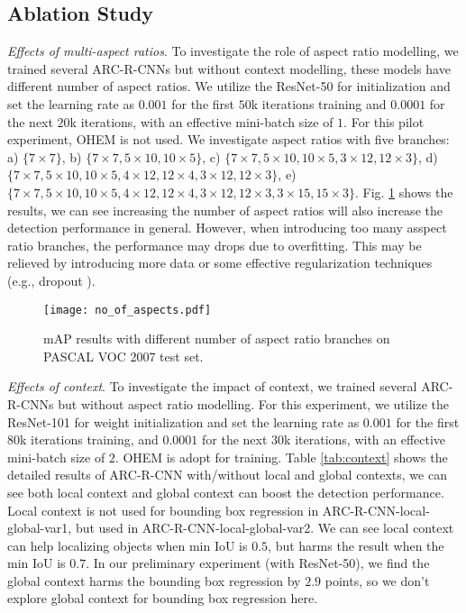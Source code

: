 \documentclass[10pt,twocolumn,letterpaper]{article}
\begin{document}
\subsection{Ablation Study}
\vspace{-1mm}
\textit{Effects of multi-aspect ratios}.
To investigate the role of aspect ratio modelling, we trained several ARC-R-CNNs but without context modelling, these models have different number of aspect ratios. 
We utilize the ResNet-50 for initialization and set the learning rate as $0.001$ for the first $50$k iterations training and $0.0001$ for the next $20$k iterations, with an effective mini-batch size of $1$. For this pilot experiment, OHEM is not used.
We investigate aspect ratios with five branches: a) $\{7\times7\}$, b) $\{7\times7, 5\times10, 10\times5\}$, c) $\{7\times7, 5\times10, 10\times5, 3\times12, 12\times3\}$, d) $\{7\times7, 5\times10, 10\times5, 4\times12, 12\times4,3\times12, 12\times3\}$, e)$\{7\times7, 5\times10, 10\times5, 4\times12, 12\times4,3\times12, 12\times3, 3\times15, 15\times3\}$.
Fig. \ref{fig:aspects} shows the results, we can see increasing the number of aspect ratios will also increase the detection performance in general.
However, when introducing too many asspect ratio branches, the performance may drops due to overfitting. This may be relieved by introducing more data or some effective regularization techniques (e.g., dropout \cite{dropout}).

\begin{figure}
\centering
{\texttt{[image: no\_of\_aspects.pdf]}}
\caption{mAP results with different number of aspect ratio branches on PASCAL VOC 2007 test set. \vspace{-3mm} }
\label{fig:aspects}
\end{figure} 

\textit{Effects of context}.
To investigate the impact of context, we trained several ARC-R-CNNs but without aspect ratio modelling.
For this experiment, we utilize the ResNet-101 for weight initialization and set the learning rate as $0.001$ for the first $80$k iterations training, and $0.0001$ for the next $30$k iterations, with an effective mini-batch size of $2$. OHEM is adopt for training. 
Table \ref{tab:context} shows the detailed results of ARC-R-CNN with/without local and global contexts, we can see both local context and global context can boost the detection performance. Local context is not used for bounding box regression in ARC-R-CNN-local-global-var1, but used in ARC-R-CNN-local-global-var2.
We can see local context can help localizing objects when min IoU is $0.5$, but harms the result when the min IoU is $0.7$.
In our preliminary experiment (with ResNet-50), we find the global context harms the bounding box regression by $2.9$ points, so we don't  explore global context for bounding box regression here.
\end{document}
